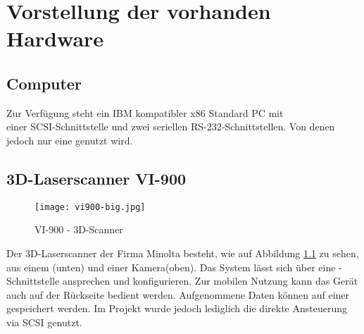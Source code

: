 \chapter{Vorstellung der vorhanden Hardware}
\label{sec:Hardware}

\section{Computer}
\label{sec:Computer}
Zur Verfügung steht ein IBM kompatibler x86 Standard PC mit \\
einer SCSI-Schnittstelle und zwei seriellen RS-232-Schnittstellen. Von denen jedoch nur eine genutzt wird.

\section{3D-Laserscanner VI-900}
\label{sec:VI-900}
\begin{figure}[htb]
\centering
\texttt{[image: vi900-big.jpg]}
\caption{VI-900 - 3D-Scanner}
\label{fig:VI900}
\end{figure}
Der 3D-Laserscanner  der Firma Minolta besteht, wie auf Abbildung \ref{fig:VI900} zu sehen, aus einem (unten) und einer Kamera(oben). Das System lässt sich über eine -Schnittstelle ansprechen und konfigurieren. Zur mobilen Nutzung kann das Gerät auch auf der Rückseite bedient werden. Aufgenommene Daten können auf einer  gespeichert werden. Im Projekt wurde jedoch lediglich die direkte Ansteuerung via SCSI genutzt.
